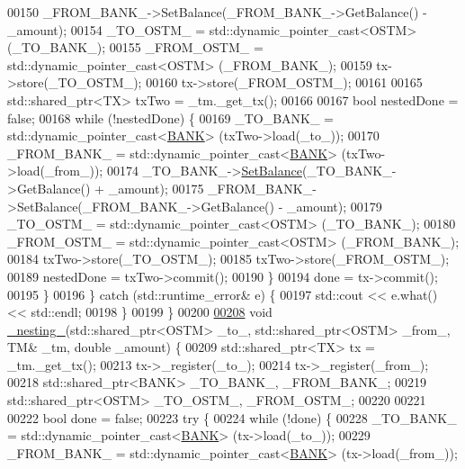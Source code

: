 \begin{DoxyCode}
00150             \_FROM\_BANK\_->SetBalance(\_FROM\_BANK\_->GetBalance() - \_amount);
00154             \_TO\_OSTM\_ = std::dynamic\_pointer\_cast<OSTM> (\_TO\_BANK\_);
00155             \_FROM\_OSTM\_ = std::dynamic\_pointer\_cast<OSTM> (\_FROM\_BANK\_);
00159             tx->store(\_TO\_OSTM\_);
00160             tx->store(\_FROM\_OSTM\_);
00161 
00165             std::shared\_ptr<TX> txTwo = \_tm.\_get\_tx();
00166 
00167             \textcolor{keywordtype}{bool} nestedDone = \textcolor{keyword}{false};
00168             \textcolor{keywordflow}{while} (!nestedDone) \{
00169                 \_TO\_BANK\_ = std::dynamic\_pointer\_cast<\hyperlink{class_b_a_n_k}{BANK}> (txTwo->load(\_to\_));
00170                 \_FROM\_BANK\_ = std::dynamic\_pointer\_cast<\hyperlink{class_b_a_n_k}{BANK}> (txTwo->load(\_from\_));
00174                 \_TO\_BANK\_->\hyperlink{class_b_a_n_k_a43bef9f486c88a2dc4906eee0e38a394}{SetBalance}(\_TO\_BANK\_->GetBalance() + \_amount);
00175                 \_FROM\_BANK\_->SetBalance(\_FROM\_BANK\_->GetBalance() - \_amount);
00179                 \_TO\_OSTM\_ = std::dynamic\_pointer\_cast<OSTM> (\_TO\_BANK\_);
00180                 \_FROM\_OSTM\_ = std::dynamic\_pointer\_cast<OSTM> (\_FROM\_BANK\_);
00184                 txTwo->store(\_TO\_OSTM\_);
00185                 txTwo->store(\_FROM\_OSTM\_);
00189                 nestedDone = txTwo->commit();
00190             \}
00194             done = tx->commit();
00195         \}
00196     \} \textcolor{keywordflow}{catch} (std::runtime\_error& e) \{
00197         std::cout << e.what() << std::endl;
00198     \}
00199 \}
00200 
\hypertarget{main_8cpp_source.tex_l00208}{}\hyperlink{main_8cpp_a5675cb594d74aa1bf5e80233370ffd81}{00208} \textcolor{keywordtype}{void} \hyperlink{main_8cpp_a5675cb594d74aa1bf5e80233370ffd81}{\_nesting\_}(std::shared\_ptr<OSTM> \_to\_, std::shared\_ptr<OSTM> \_from\_, TM& \_tm, \textcolor{keywordtype}{double} \_amount) 
      \{
00209     std::shared\_ptr<TX> tx = \_tm.\_get\_tx();
00213     tx->\_register(\_to\_);
00214     tx->\_register(\_from\_);
00218     std::shared\_ptr<BANK> \_TO\_BANK\_, \_FROM\_BANK\_;
00219     std::shared\_ptr<OSTM> \_TO\_OSTM\_, \_FROM\_OSTM\_;
00220 
00221 
00222     \textcolor{keywordtype}{bool} done = \textcolor{keyword}{false};
00223     \textcolor{keywordflow}{try} \{
00224         \textcolor{keywordflow}{while} (!done) \{
00228             \_TO\_BANK\_ = std::dynamic\_pointer\_cast<\hyperlink{class_b_a_n_k}{BANK}> (tx->load(\_to\_));
00229             \_FROM\_BANK\_ = std::dynamic\_pointer\_cast<\hyperlink{class_b_a_n_k}{BANK}> (tx->load(\_from\_));

\end{DoxyCode}

